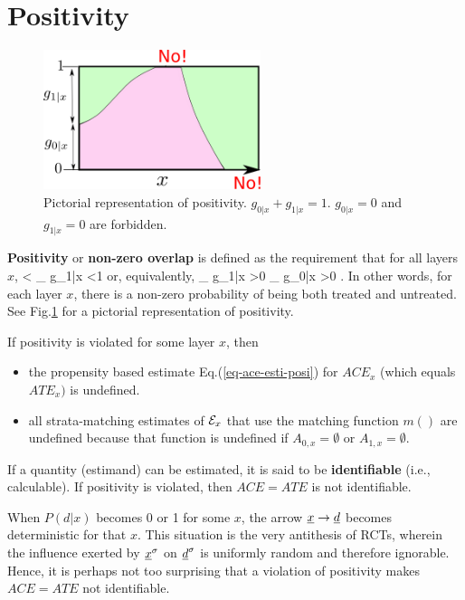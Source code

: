 \section{Positivity}

\begin{figure}[h!]
\centering
\includegraphics[width=2.5in]
{pot-out/po-positivity}
\caption{Pictorial
representation of positivity.
$g_{0|x}+g_{1|x}=1$.
$g_{0|x}=0$
and
$g_{1|x}=0$ are forbidden.} 
\label{fig-po-positivity}
\end{figure}



{\bf Positivity} 
or {\bf
non-zero overlap} is defined as the
requirement that for all layers $x$,
<
_{
g_{1|x}}
<1
\eeq
or, equivalently, 
\beq
{}_
{g_{1|x}}
>0
_
{g_{0|x}}
>0
\;.
\eeq
In other words, 
for each layer $x$,
there is
a non-zero
probability of being both treated 
and untreated.
See Fig.\ref{fig-po-positivity} for a pictorial 
representation of positivity.

If positivity is violated 
for some layer $x$, then
\begin{itemize}
\item
the propensity based estimate
Eq.(\ref{eq-ace-esti-posi}) for 
 $ACE_x$
(which equals ${ATE}_x)$
is undefined. 
\item
all strata-matching estimates of
${\cal E}_x$
that use the matching function 
$m()$
are undefined
because that function 
is undefined if $A_{0,x}=\emptyset$
or $A_{1,x}=\emptyset$.
\end{itemize}
If a quantity (estimand)
 can be estimated,
it is said to be {\bf identifiable}
 (i.e.,
calculable). If positivity is violated,
 then
 $ACE=ATE$ is not identifiable.

 

When 
$P(d|x)$ 
becomes 0 or 1 for some $x$,
the arrow
${\underline{x}}\rightarrow{\underline{d}}$
becomes deterministic
for that $x$.
This situation
is
the very 
antithesis
of RCTs,
wherein 
the influence
exerted by ${\underline{x}}^\sigma$ on 
${\underline{d}}^\sigma$ is uniformly
random and therefore ignorable.
Hence, it is perhaps 
not too surprising
that a violation
of positivity makes
$ACE=ATE$
not identifiable.



